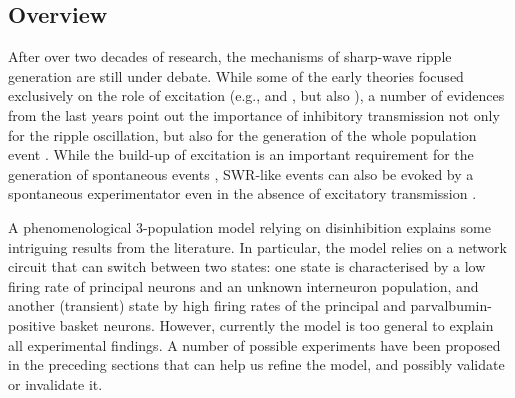   \subsection{Overview}
    After over two decades of research, the mechanisms of sharp-wave ripple
    generation are still under debate. While some of the early theories focused
    exclusively on the role of excitation (e.g., \citealp{Draguhn1998} and
    \citealp{Memmesheimer2010}, but also \citealp{Ylinen1995}), a number of
    evidences from the last years point out the importance of inhibitory
    transmission not only for the ripple oscillation, but also for the
    generation of the whole population event \citep{Maier2011, Schlingloff2014,
    Stark2014, Kohus2016}. While the build-up of excitation is an important
    requirement for the generation of spontaneous events \citep{delaPrida2006,
    Ellender2010, Schlingloff2014, Hulse2016}, SWR-like events can also be
    evoked by a spontaneous experimentator \citep{Maier2003, Nimmrich2005,
    Both2008, Kohus2016} even in the absence of excitatory transmission
    \citep{Schlingloff2014}.
    
    A phenomenological 3-population model relying on disinhibition explains
    some intriguing results from the literature. In particular, the model
    relies on a network circuit that can switch between two states: one state
    is characterised by a low firing rate of principal neurons and an unknown
    interneuron population, and another (transient) state by high firing rates
    of the principal and parvalbumin-positive basket neurons. However,
    currently the model is too general to explain all experimental findings. A
    number of possible experiments have been proposed in the preceding sections
    that can help us refine the model, and possibly validate or invalidate it. 

